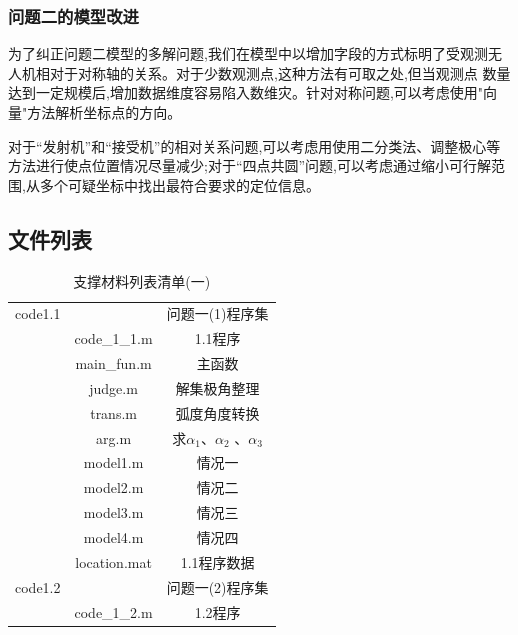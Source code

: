 \documentclass[withoutpreface,bwprint]{cumcmthesis}
\begin{document}
	\subsubsection{问题二的模型改进}	
	
	为了纠正问题二模型的多解问题,我们在模型中以增加字段的方式标明了受观测无人机相对于对称轴的关系。对于少数观测点,这种方法有可取之处,但当观测点
	数量达到一定规模后,增加数据维度容易陷入数维灾。针对对称问题,可以考虑使用"向量"方法解析坐标点的方向。
	
	对于“发射机”和“接受机”的相对关系问题,可以考虑用使用二分类法、调整极心等方法进行使点位置情况尽量减少;对于“四点共圆”问题,可以考虑通过缩小可行解范围,从多个可疑坐标中找出最符合要求的定位信息。
	\newpage
	
	\newpage
	\begin{appendices}
		\section{文件列表}
		\begin{table}[htbp]
			\renewcommand\arraystretch{0.1}
			\tabcolsep=0.2cm
			\centering
			\caption{支撑材料列表清单(一)}
			\begin{tabular}{ccc}
				\toprule[1.5pt]
				\makebox[0.27\textwidth][c]{文件夹名}	& \makebox[0.3\textwidth][c]{文件夹内容}	& \makebox[0.4\textwidth][c]{文件描述} \\ 
				\midrule
				code1.1	& & 问题一(1)程序集 \\
				&code\_1\_1.m  & 1.1程序 \\
				
				&main\_fun.m  & 主函数\\
				
				&judge.m  & 解集极角整理\\
				
				&trans.m  & 弧度角度转换 \\
				&arg.m & 求$\alpha_{1}$、$\alpha_{2}$ 、$\alpha_{3}$  \\
				&model1.m  & 情况一 \\
				&model2.m  & 情况二 \\
				&model3.m  & 情况三 \\
				&model4.m  & 情况四 \\
				&location.mat  & 1.1程序数据 \\
				
				code1.2	&& 问题一(2)程序集 \\
				
				&code\_1\_2.m  & 1.2程序 \\
				

\end{tabular}
\end{table}
\end{appendices}
\end{document}
